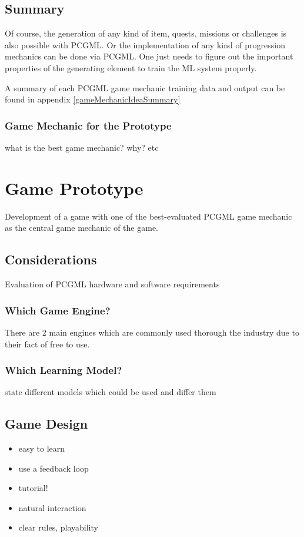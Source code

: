 \documentclass[MGS,Master,english]{twbook}%
\begin{document}
\section{Summary}

Of course, the generation of any kind of item, quests, missions or challenges is also possible with PCGML. Or the implementation of any kind of progression mechanics can be done via PCGML. One just needs to figure out the important properties of the generating element to train the ML system properly.

A summary of each PCGML game mechanic training data and output can be found in appendix \ref{gameMechanicIdeaSummary}

\subsection{Game Mechanic for the Prototype}
what is the best game mechanic? why? etc


%
%
\clearpage
\chapter{Game Prototype}
Development of a game with one of the best-evaluated PCGML game mechanic as the central game mechanic of the game.
\section{Considerations}

Evaluation of PCGML hardware and software requirements
\subsection{Which Game Engine?}
There are 2 main engines which are commonly used thorough the industry due to their fact of free to use.

\subsection{Which Learning Model?}
state different models which could be used and differ them

\section{Game Design}
\begin{itemize}
	\item easy to learn
	\item use a feedback loop
	\item tutorial!
	\item natural interaction
	\item clear rules, playability	
\end{itemize}
\end{document}
